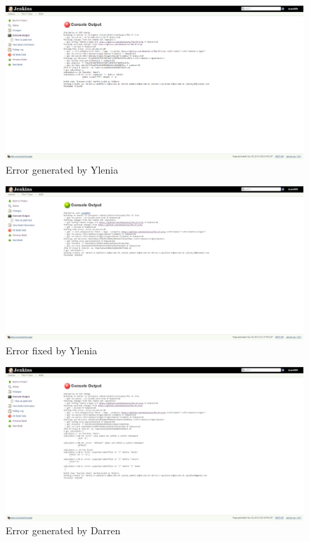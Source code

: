 \documentclass[UTF8]{article}
\begin{document}
\begin{figure}[h]
  \includegraphics[width=\textwidth, height=\textheight,keepaspectratio]{Break2Ylenia.PNG}
  \caption{Error generated by Ylenia}
\end{figure}

\newpage
\begin{figure}[h]
  \includegraphics[width=\textwidth, height=\textheight,keepaspectratio]{Fix2Ylenia.PNG}
  \caption{Error fixed by Ylenia}
\end{figure}

\begin{figure}[h]
  \includegraphics[width=\textwidth, height=\textheight,keepaspectratio]{Break3Darren.PNG}
  \caption{Error generated by Darren}
\end{figure}
\end{document}
